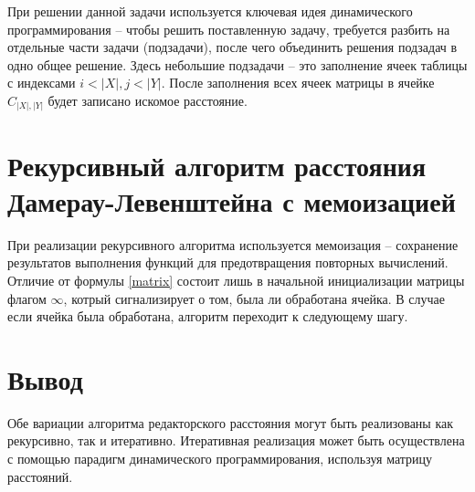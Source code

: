 При решении данной задачи используется ключевая идея динамического программирования -- чтобы решить поставленную задачу, требуется разбить на отдельные части задачи (подзадачи), после чего объединить решения подзадач в одно общее решение. Здесь небольшие подзадачи -- это заполнение ячеек таблицы с индексами $i < |X|, j < |Y|$. После заполнения всех ячеек матрицы в ячейке $C_{|X|, |Y|}$ будет записано искомое расстояние.



\section{Рекурсивный алгоритм расстояния Дамерау-Левенштейна с мемоизацией}
При реализации рекурсивного алгоритма используется мемоизация -- сохранение результатов выполнения функций для предотвращения повторных вычислений. Отличие от формулы \ref{matrix} состоит лишь в начальной инициализации матрицы флагом $\infty$, котрый сигнализирует о том, была ли обработана ячейка. В случае если ячейка была обработана, алгоритм переходит к следующему шагу. 


\section{Вывод}
Обе вариации алгоритма редакторского расстояния могут быть реализованы как рекурсивно, так и итеративно. Итеративная реализация может быть осуществлена с помощью парадигм динамического программирования, используя матрицу расстояний. \cite{damerau}